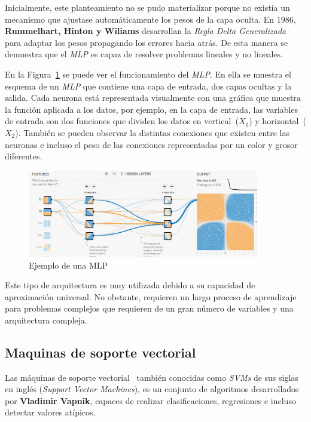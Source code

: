 Inicialmente, este planteamiento no se pudo materializar porque no existía un mecanismo que ajustase automáticamente los pesos de la capa oculta. En 1986, \textbf{Rummelhart, Hinton y Wiliams} desarrollan la \textit{Regla Delta Generalizada}~\cite{rumelhart1988learning} para adaptar los pesos propagando los errores hacia atrás. De esta manera se demuestra que el \textit{MLP} es capaz de resolver problemas lineales y no lineales.

En la Figura~\ref{fig:MLP_example} se puede ver el funcionamiento del \textit{MLP}. En ella se muestra el esquema de un \textit{MLP} que contiene una capa de entrada, dos capas ocultas y la salida. 
Cada neurona está representada visualmente con una gráfica que muestra la función aplicada a los datos, por ejemplo, en la capa de entrada, las variables de entrada son dos funciones que dividen los datos en vertical~($X_1$) y horizontal~($X_2$). También se pueden observar la distintas conexiones que existen entre las neuronas e incluso el peso de las conexiones representadas por un color y grosor diferentes.

\begin{figure}[!h]
    \centering
    \includegraphics[width=0.9\textwidth, keepaspectratio]{imaxes/MLP_example.png}
    \caption[Ejemplo de una MLP]{Ejemplo de una MLP~\cite{tensorflow}}
    \label{fig:MLP_example}
\end{figure}


Este tipo de arquitectura es muy utilizada debido a su capacidad de aproximación universal. No obstante, requieren un largo proceso de aprendizaje para problemas complejos que requieren de un gran número de variables y una arquitectura compleja.




\subsection{Maquinas de soporte vectorial}
\label{sec:svm}
Las máquinas de soporte vectorial~\cite{berwick2003idiot} también conocidas como \textit{SVMs} de sus siglas en inglés (\textit{Support Vector Machines}), es un conjunto de algoritmos desarrollados por \textbf{Vladimir Vapnik}, capaces de realizar clasificaciones, regresiones e incluso detectar valores atípicos. 


